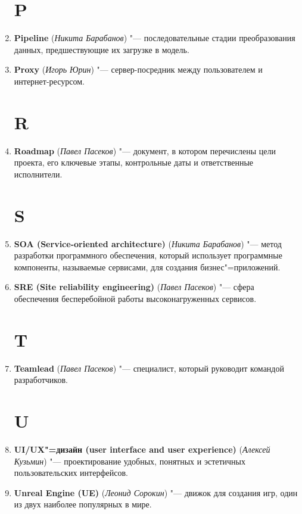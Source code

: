 \documentclass[14pt]{extarticle}
\begin{document}
\begin{enumerate}
    \section*{P}
    \item \textbf{Pipeline} (\textit{Никита Барабанов}) "--- последовательные стадии преобразования данных, предшествующие их загрузке в модель.
    
    \item \textbf{Proxy} (\textit{Игорь Юрин}) "--- сервер-посредник между пользователем и интернет-ресурсом.
    \section*{R}
    
    \item \textbf{Roadmap} (\textit{Павел Пасеков}) "--- документ, в котором перечислены цели проекта, его ключевые этапы, контрольные даты и ответственные исполнители.
    \section*{S}
    \item \textbf{SOA (Service-oriented architecture)} (\textit{Никита Барабанов}) "--- метод разработки программного обеспечения, который использует программные компоненты, называемые сервисами, для создания бизнес"=приложений.
    
    \item \textbf{SRE (Site reliability engineering)} (\textit{Павел Пасеков}) "--- сфера обеспечения бесперебойной работы высоконагруженных сервисов.
    \section*{T}
    
    \item \textbf{Teamlead} (\textit{Павел Пасеков}) "--- специалист, который руководит командой разработчиков.
    \section*{U}
    \item \textbf{UI/UX"=дизайн (user interface and user experience)} (\textit{Алексей Кузьмин}) "--- проектирование удобных, понятных и эстетичных пользовательских интерфейсов.
    \item \textbf{Unreal Engine (UE)} (\textit{Леонид Сорокин}) "--- движок для создания игр, один из двух наиболее популярных в мире.

\end{enumerate}
\end{document}
